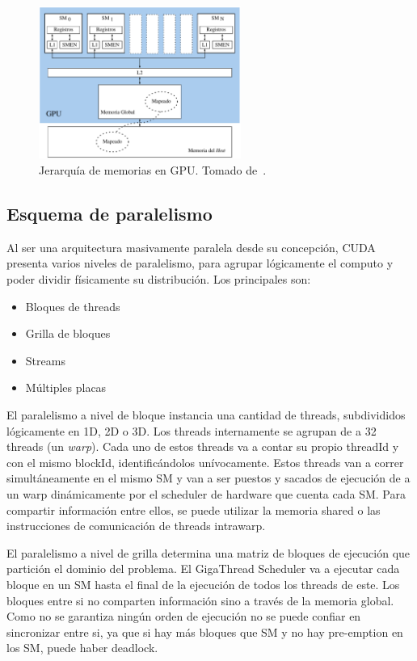\begin{figure}[htbp]
    \centering
    \includegraphics[width=250px]{images/cuda-memories_ES.pdf}
    \caption{Jerarqu\'ia de memorias en GPU. Tomado de~\cite{farberCuda}.}
    \label{fig:cuda-memories}
\end{figure}

\subsection{Esquema de paralelismo}
Al ser una arquitectura masivamente paralela desde su concepci\'on, CUDA presenta varios niveles de paralelismo, para
agrupar l\'ogicamente el computo y poder dividir f\'isicamente su distribuci\'on. Los principales son:
\begin{itemize}
  \item Bloques de threads
  \item Grilla de bloques
  \item Streams
  \item M\'ultiples placas
\end{itemize}

El paralelismo a nivel de bloque instancia una cantidad de threads, subdivididos l\'ogicamente en 1D, 2D o 3D.
Los threads internamente se agrupan de a 32 threads (un \textit{warp}).
Cada uno de estos threads va a contar su propio threadId y con el mismo blockId, identific\'andolos un\'ivocamente.
Estos threads van a correr simult\'aneamente en el mismo SM y van a ser puestos y sacados de ejecuci\'on de a un warp
din\'amicamente por el scheduler de hardware que cuenta cada SM. Para compartir informaci\'on entre
ellos, se puede utilizar la memoria shared o las instrucciones de comunicaci\'on de threads intrawarp.

El paralelismo a nivel de grilla determina una matriz de bloques de ejecuci\'on que partici\'on
el dominio del problema. El GigaThread Scheduler va a ejecutar cada bloque en un SM hasta
el final de la ejecuci\'on de todos los threads de este. Los bloques entre si no comparten informaci\'on
sino a trav\'es de la memoria global. Como no se garantiza ning\'un orden de ejecuci\'on no se puede
confiar en sincronizar entre si, ya que si hay m\'as bloques que SM y no hay pre-emption en los SM,
puede haber deadlock.

